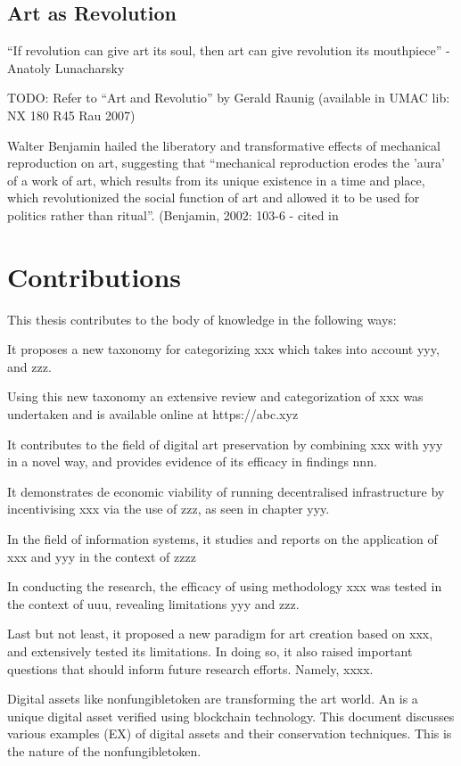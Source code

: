 \subsection{Art as Revolution}

``If revolution can give art its soul, then art can give revolution its mouthpiece'' - Anatoly Lunacharsky

TODO: Refer to ``Art and Revolutio'' by Gerald Raunig (available in UMAC lib: NX 180 R45 Rau 2007)

Walter Benjamin hailed the liberatory and transformative effects of mechanical reproduction on art, suggesting that ``mechanical reproduction erodes the 'aura' of a work of art, which results from its unique existence in a time and place, which revolutionized the social function of art and allowed it to be used for politics rather than ritual''. (Benjamin, 2002: 103-6 - cited in \cite[p.3]{gereArtTimeTechnology2006}

\section{Contributions}

This thesis contributes to the body of knowledge in the following ways:

It proposes a new taxonomy for categorizing xxx which takes into account yyy, and zzz.

Using this new taxonomy an extensive review and categorization of xxx was undertaken and is available online at https://abc.xyz

It contributes to the field of digital art preservation by combining xxx with yyy in a novel way, and provides evidence of its efficacy in findings nnn.

It demonstrates de economic viability of running decentralised infrastructure by incentivising xxx via the use of zzz, as seen in chapter yyy.

In the field of information systems, it studies and reports on the application of xxx and yyy in the context of zzzz

In conducting the research, the efficacy of using methodology xxx was tested in the context of uuu, revealing limitations yyy and zzz.

Last but not least, it proposed a new paradigm for art creation based on xxx, and extensively tested its limitations. In doing so, it also raised important questions that should inform future research efforts. Namely, xxxx.

Digital assets like \gls{nonfungibletoken} are transforming the art world. An  is a unique digital asset verified using blockchain technology.
This document discusses various examples (EX) of digital assets and their conservation techniques. This is the nature of the \gls{nonfungibletoken}.



